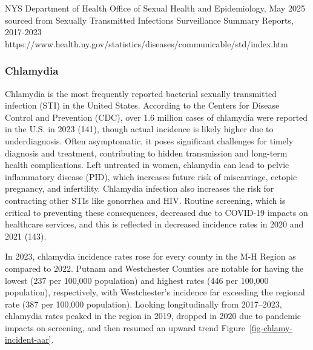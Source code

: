\documentclass[
  english,
  letterpaper,
]{report}
\begin{document}
\begin{tcolorbox}[enhanced jigsaw, breakable, leftrule=.75mm, title=\textcolor{quarto-callout-note-color}{\faInfo}\hspace{0.5em}{Source}, bottomrule=.15mm, opacityback=0, left=2mm, colback=white, bottomtitle=1mm, coltitle=black, colbacktitle=quarto-callout-note-color!10!white, colframe=quarto-callout-note-color-frame, opacitybacktitle=0.6, toptitle=1mm, titlerule=0mm, arc=.35mm, rightrule=.15mm, toprule=.15mm]

NYS Department of Health Office of Sexual Health and Epidemiology, May
2025 sourced from Sexually Transmitted Infections Surveillance Summary
Reports, 2017-2023
https://www.health.ny.gov/statistics/diseases/communicable/std/index.htm

\end{tcolorbox}

\subsubsection{Chlamydia}\label{chlamydia}

Chlamydia is the most frequently reported bacterial sexually transmitted
infection (STI) in the United States. According to the Centers for
Disease Control and Prevention (CDC), over 1.6 million cases of
chlamydia were reported in the U.S. in 2023 (141), though actual
incidence is likely higher due to underdiagnosis. Often asymptomatic, it
poses significant challenges for timely diagnosis and treatment,
contributing to hidden transmission and long-term health complications.
Left untreated in women, chlamydia can lead to pelvic inflammatory
disease (PID), which increases future risk of miscarriage, ectopic
pregnancy, and infertility. Chlamydia infection also increases the risk
for contracting other STIs like gonorrhea and HIV. Routine screening,
which is critical to preventing these consequences, decreased due to
COVID-19 impacts on healthcare services, and this is reflected in
decreased incidence rates in 2020 and 2021 (143).

In 2023, chlamydia incidence rates rose for every county in the M-H
Region as compared to 2022. Putnam and Westchester Counties are notable
for having the lowest (237 per 100,000 population) and highest rates
(446 per 100,000 population), respectively, with Westchester's incidence
far exceeding the regional rate (387 per 100,000 population). Looking
longitudinally from 2017--2023, chlamydia rates peaked in the region in
2019, dropped in 2020 due to pandemic impacts on screening, and then
resumed an upward trend Figure~\ref{fig-chlamy-incident-aar}.
\end{document}
